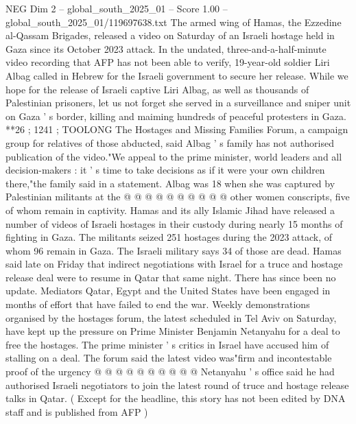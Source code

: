 \begin{textsample}{NEG Dim 2 – global\_south\_2025\_01 – Score 1.00 – global\_south\_2025\_01/119697638.txt}  \label{ex:f2_neg_130}
The armed wing of Hamas, the Ezzedine al-Qassam Brigades, released a video on Saturday of an Israeli hostage held in Gaza since its October 2023 attack.
In the undated, three-and-a-half-minute video recording that AFP has not been able to verify, 19-year-old soldier Liri Albag called in Hebrew for the Israeli government to secure her release.
While we hope for the release of Israeli captive Liri Albag, as well as thousands of Palestinian prisoners, let us not forget she served in a surveillance and sniper unit on Gaza ' s border, killing and maiming hundreds of peaceful protesters in Gaza. **26 ; 1241 ; TOOLONG The Hostages and Missing Families Forum, a campaign group for relatives of those abducted, said Albag ' s family has not authorised publication of the video."We appeal to the prime minister, world leaders and all decision-makers : it ' s time to take decisions as if it were your own children there,"the family said in a statement.
Albag was 18 when she was captured by Palestinian militants at the @ @ @ @ @ @ @ @ @ @ other women conscripts, five of whom remain in captivity.
Hamas and its ally Islamic Jihad have released a number of videos of Israeli hostages in their custody during nearly 15 months of fighting in Gaza.
The militants seized 251 hostages during the 2023 attack, of whom 96 remain in Gaza.
The Israeli military says 34 of those are dead.
Hamas said late on Friday that indirect negotiations with Israel for a truce and hostage release deal were to resume in Qatar that same night.
There has since been no update.
Mediators Qatar, Egypt and the United States have been engaged in months of effort that have failed to end the war.
Weekly demonstrations organised by the hostages forum, the latest scheduled in Tel Aviv on Saturday, have kept up the pressure on Prime Minister Benjamin Netanyahu for a deal to free the hostages.
The prime minister ' s critics in Israel have accused him of stalling on a deal.
The forum said the latest video was"firm and incontestable proof of the urgency @ @ @ @ @ @ @ @ @ @ Netanyahu ' s office said he had authorised Israeli negotiators to join the latest round of truce and hostage release talks in Qatar. ( Except for the headline, this story has not been edited by DNA staff and is published from AFP )

\end{textsample}
